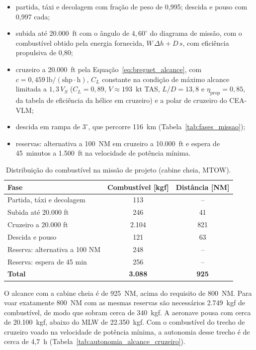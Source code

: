 \begin{itemize}
    \item partida, táxi e decolagem com fração de peso de 0,995; descida e pouso com 0,997 cada;
    \item subida até 20.000~ft com o ângulo de $4{,}60^{\circ}$ do diagrama de missão, com o combustível obtido pela energia fornecida, $W\,\Delta h + D\,s$, com eficiência propulsiva de 0,80;
    \item cruzeiro a 20.000~ft pela Equação~\ref{eq:breguet_alcance}, com $c = 0{,}459~\mathrm{lb/(shp\cdot h)}$, $C_L$ constante na condição de máximo alcance limitada a $1{,}3\,V_S$ ($C_L = 0{,}89$, $V \approx 193$~kt TAS, $L/D = 13{,}8$ e $\eta_{\mathrm{prop}} = 0{,}85$, da tabela de eficiência da hélice em cruzeiro) e a polar de cruzeiro do CEA-VLM;
    \item descida em rampa de $3^{\circ}$, que percorre 116~km (Tabela~\ref{tab:fases_missao});
    \item reservas: alternativa a 100~NM em cruzeiro a 10.000~ft e espera de 45~minutos a 1.500~ft na velocidade de potência mínima.
\end{itemize}

\begin{table}[H]
    \centering
    \caption{Distribuição do combustível na missão de projeto (cabine cheia, MTOW).}
    \label{tab:combustivel_missao}
    \begin{tabular}{lcc}
        \toprule
        \textbf{Fase} & \textbf{Combustível [kgf]} & \textbf{Distância [NM]} \\
        \midrule
        Partida, táxi e decolagem & 113 & -- \\
        Subida até 20.000 ft & 246 & 41 \\
        Cruzeiro a 20.000 ft & 2.104 & 821 \\
        Descida e pouso & 121 & 63 \\
        Reserva: alternativa a 100 NM & 248 & -- \\
        Reserva: espera de 45 min & 256 & -- \\
        \midrule
        \textbf{Total} & \textbf{3.088} & \textbf{925} \\
        \bottomrule
    \end{tabular}
\end{table}

O alcance com a cabine cheia é de 925~NM, acima do requisito de 800~NM. Para voar exatamente 800~NM com as mesmas reservas são necessários 2.749~kgf de combustível, de modo que sobram cerca de 340~kgf. A aeronave pousa com cerca de 20.100~kgf, abaixo do MLW de 22.350~kgf. Com o combustível do trecho de cruzeiro voado na velocidade de potência mínima, a autonomia desse trecho é de cerca de 4,7~h (Tabela~\ref{tab:autonomia_alcance_cruzeiro}).

